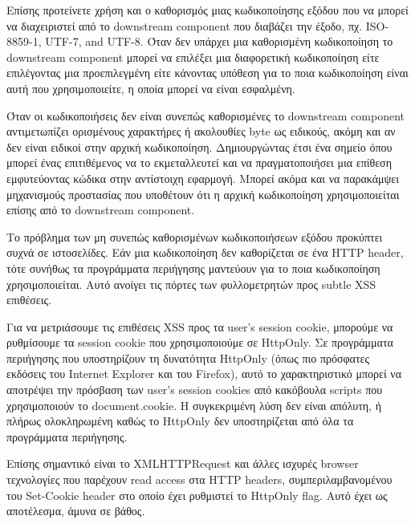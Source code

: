 \noindent
Επίσης προτείνετε χρήση και ο καθορισμός μιας κωδικοποίησης εξόδου που να μπορεί να διαχειριστεί από το downstream component που διαβάζει την έξοδο, πχ. ISO-8859-1, UTF-7, and UTF-8. Όταν δεν υπάρχει μια καθορισμένη κωδικοποίηση το downstream component μπορεί να επιλέξει μια διαφορετική κωδικοποίηση είτε επιλέγοντας μια προεπιλεγμένη είτε κάνοντας υπόθεση για το ποια κωδικοποίηση είναι αυτή που χρησιμοποιείτε, η οποία μπορεί να είναι εσφαλμένη.

\noindent
Όταν οι κωδικοποιήσεις δεν είναι συνεπώς καθορισμένες το downstream component αντιμετωπίζει ορισμένους χαρακτήρες ή ακολουθίες byte ως ειδικούς, ακόμη και αν δεν είναι ειδικοί στην αρχική κωδικοποίηση. Δημιουργώντας έτσι ένα σημείο όπου μπορεί ένας επιτιθέμενος να το εκμεταλλευτεί και να πραγματοποιήσει μια επίθεση εμφυτεύοντας κώδικα στην αντίστοιχη εφαρμογή. Μπορεί ακόμα και να παρακάμψει μηχανισμούς προστασίας που υποθέτουν ότι η αρχική κωδικοποίηση χρησιμοποιείται επίσης από το downstream component.

\noindent
Το πρόβλημα των μη συνεπώς καθορισμένων κωδικοποιήσεων εξόδου προκύπτει συχνά σε ιστοσελίδες. Εάν μια κωδικοποίηση δεν καθορίζεται σε ένα HTTP header, τότε συνήθως τα προγράμματα περιήγησης μαντεύουν για το ποια κωδικοποίηση χρησιμοποιείται. Αυτό ανοίγει τις πόρτες των φυλλομετρητών προς subtle XSS επιθέσεις.

\noindent
Για να μετριάσουμε τις επιθέσεις XSS προς τα user's session cookie, μπορούμε να ρυθμίσουμε τα session cookie που χρησιμοποιούμε σε HttpOnly. Σε προγράμματα περιήγησης που υποστηρίζουν τη δυνατότητα HttpOnly (όπως πιο πρόσφατες εκδόσεις του Internet Explorer και του Firefox), αυτό το χαρακτηριστικό μπορεί να αποτρέψει την πρόσβαση των user's session cookies από κακόβουλα scripts που χρησιμοποιούν το document.cookie. Η συγκεκριμένη λύση δεν είναι απόλυτη, ή πλήρως ολοκληρωμένη καθώς το HttpOnly δεν υποστηρίζεται από όλα τα προγράμματα περιήγησης.

\noindent
Επίσης σημαντικό είναι το XMLHTTPRequest και άλλες ισχυρές browser τεχνολογίες που παρέχουν read access στα HTTP headers, συμπεριλαμβανομένου του Set-Cookie header στο οποίο έχει ρυθμιστεί το HttpOnly flag. Αυτό έχει ως αποτέλεσμα, άμυνα σε βάθος.
